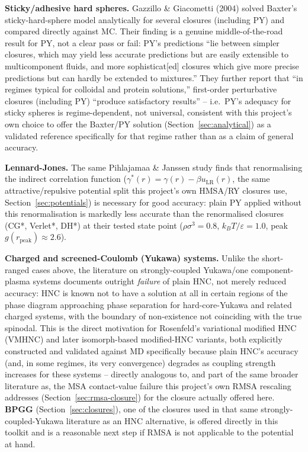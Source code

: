 \documentclass[11pt,a4paper]{article}
\begin{document}
\textbf{Sticky/adhesive hard spheres.} Gazzillo \& Giacometti (2004)
\cite{gazzillo2004} solved Baxter's sticky-hard-sphere model analytically
for several closures (including PY) and compared directly against MC. Their
finding is a genuine middle-of-the-road result for PY, not a clear pass or
fail: PY's predictions ``lie between simpler closures, which may yield less
accurate predictions but are easily extensible to multicomponent fluids,
and more sophisticat[ed] closures which give more precise predictions but
can hardly be extended to mixtures.'' They further report that ``in regimes
typical for colloidal and protein solutions,'' first-order perturbative
closures (including PY) ``produce satisfactory results'' -- i.e.\ PY's
adequacy for sticky spheres is regime-dependent, not universal, consistent
with this project's own choice to offer the Baxter/PY solution
(Section~\ref{sec:analytical}) as a validated reference specifically for
that regime rather than as a claim of general accuracy.

\textbf{Lennard-Jones.} The same Pihlajamaa \& Janssen study
\cite{pihlajamaa2024} finds that renormalising the indirect correlation
function ($\gamma^*(r)=\gamma(r)-\beta u_{\mathrm{LR}}(r)$, the same
attractive/repulsive potential split this project's own HMSA/RY closures
use, Section~\ref{sec:potentials}) is necessary for good accuracy: plain PY
applied without this renormalisation is markedly less accurate than the
renormalised closures (CG*, Verlet*, DH*) at their tested state point
($\rho\sigma^3=0.8$, $k_BT/\varepsilon=1.0$, peak $g(r_{\mathrm{peak}})\approx2.6$).

\textbf{Charged and screened-Coulomb (Yukawa) systems.} Unlike the
short-ranged cases above, the literature on strongly-coupled Yukawa/one
component-plasma systems documents outright \emph{failure} of plain HNC,
not merely reduced accuracy: HNC is known not to have a solution at all in
certain regions of the phase diagram approaching phase separation for
hard-core-Yukawa and related charged systems, with the boundary of
non-existence not coinciding with the true spinodal. This is the direct
motivation for Rosenfeld's variational modified HNC (VMHNC)
\cite{rosenfeld1986} and later isomorph-based modified-HNC variants, both
explicitly constructed and validated against MD specifically because plain
HNC's accuracy (and, in some regimes, its very convergence) degrades as
coupling strength increases for these systems -- directly analogous to, and
part of the same broader literature as, the MSA contact-value failure this
project's own RMSA rescaling addresses (Section~\ref{sec:rmsa-closure}) for
the closure actually offered here. \textbf{BPGG}
(Section~\ref{sec:closures}), one of the closures used in that same
strongly-coupled-Yukawa literature as an HNC alternative, is offered
directly in this toolkit and is a reasonable next step if RMSA is not
applicable to the potential at hand.
\end{document}
